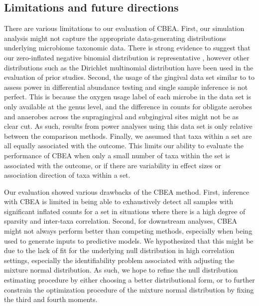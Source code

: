 \documentclass[10pt,letterpaper]{article}
\begin{document}
\subsection*{Limitations and future directions} 
There are various limitations to our evaluation of CBEA. First, our simulation analysis might not capture the appropriate data-generating distributions underlying microbiome taxonomic data. There is strong evidence to suggest that our zero-inflated negative binomial distribution is representative \cite{calgaro2020}, however other distributions such as the Dirichlet multinomial distribution \cite{wu2016a} have been used in the evaluation of prior studies. Second, the usage of the gingival data set similar to \cite{calgaro2020} to assess power in differential abundance testing and single sample inference is not perfect. This is because the oxygen usage label of each microbe in the data set is only available at the genus level, and the difference in counts for obligate aerobes and anaerobes across the supragingival and subgingival sites might not be as clear cut. As such, results from power analyses using this data set is only relative between the comparison methods. Finally, we assumed that taxa within a set are all equally associated with the outcome. This limits our ability to evaluate the performance of CBEA when only a small number of taxa within the set is associated with the outcome, or if there are variability in effect sizes or association direction of taxa within a set. 

Our evaluation showed various drawbacks of the CBEA method. First, inference with CBEA is limited in being able to exhaustively detect all samples with significant inflated counts for a set in situations where there is a high degree of sparsity and inter-taxa correlation. Second, for downstream analyses, CBEA might not always perform better than competing methods, especially when being used to generate inputs to predictive models. We hypothesized that this might be due to the lack of fit for the underlying null distribution in high correlation settings, especially the identifiability problem associated with adjusting the mixture normal distribution. As such, we hope to refine the null distribution estimating procedure by either choosing a better distributional form, or to further constrain the optimization procedure of the mixture normal distribution by fixing the third and fourth moments. 
\end{document}
